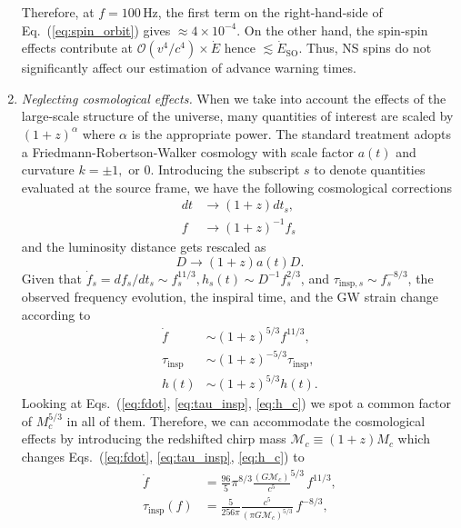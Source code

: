 \documentclass[prd,amsmath,amssymb,aps,floats,amsfonts,notitlepage,superscriptaddress,eqsecnum,nofootinbib,10pt]{revtex4-1}
\newcommand{\ord}{\mathcal{O}}
\newcommand{\f}{\frac}
\newcommand{\be}{\begin{equation}}
\newcommand{\ee}{\end{equation}}
\begin{document}
\begin{enumerate}
Therefore, at $f= 100\,$Hz, the first term on the right-hand-side of Eq.~(\ref{eq:spin_orbit}) gives $\approx 4\times 10^{-4}$. 
On the other hand, the spin-spin effects contribute at $\ord(v^4/c^4)\times\dot{E}$ hence $\lesssim \dot{E}_\text{SO}$.
Thus, NS spins do not significantly affect our estimation of advance warning times. %
%
\item {\it Neglecting cosmological effects.}
When we take into account the effects of the large-scale structure of the universe, many quantities of interest are scaled by $(1+z)^\alpha$ where $\alpha$
is the appropriate power. The standard treatment adopts a Friedmann-Robertson-Walker cosmology with scale factor $a(t)$ and curvature $k=\pm 1, \text{ or } 0$.
Introducing the subscript $s$ to denote quantities evaluated at the source frame, we have the following cosmological corrections
%
\begin{align}
dt& \rightarrow (1+z) dt_s, \\
 f & \rightarrow (1+z)^{-1} f_s\, 
\end{align}
and the luminosity distance gets rescaled as
\be
D  \rightarrow  (1+z)a(t) D.
\ee
%
Given that $\dot{f}_s=df_s/dt_s\sim f^{11/3}_s, h_s(t)\sim D^{-1} f_s^{2/3}$, and $\tau_{\text{insp},s}\sim f_s^{-8/3}$,
the observed frequency evolution, the inspiral time, 
and the GW strain change according to %
\begin{align}
\dot{f}\ \ &\sim (1+z)^{5/3}{f}^{11/3},\\
\tau_\text{insp}& \sim (1+z)^{-5/3} \tau_{\text{insp}},\\
h(t) & \sim (1+z)^{5/3} h(t).
\end{align}
%
Looking at Eqs.~(\ref{eq:fdot}, \ref{eq:tau_insp}, \ref{eq:h_c}) we spot a common factor of $M_c^{5/3}$ in all of them.
Therefore, we can accommodate the cosmological effects by introducing the redshifted chirp mass $\mathcal{M}_c\equiv (1+z) M_c$
which changes Eqs.~(\ref{eq:fdot}, \ref{eq:tau_insp}, \ref{eq:h_c}) to
%
\begin{align}
\dot{f} &= \f{96}{5}\pi^{8/3} \f{(G \mathcal{M}_c)}{c^5}^{5/3}\, f^{11/3} \label{eq:fdot_redshifted},\\
\tau_\text{insp}(f) &= \f{5}{256\pi}\f{c^5}{(\pi G \mathcal{M}_c)^{5/3}} \,f^{-8/3}\label{eq:tau_insp_redshifted}, \\

\end{align}
\end{enumerate}
\end{document}
